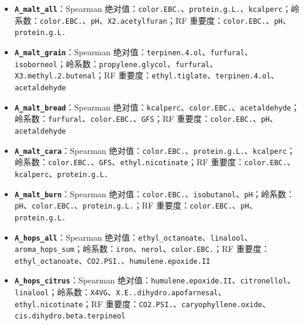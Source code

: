 \documentclass[
  11pt,
]{ctexart}
\providecommand{\tightlist}{%
  \setlength{\itemsep}{0pt}\setlength{\parskip}{0pt}}
\begin{document}
\begin{itemize}
\tightlist
\item
  \textbf{\texttt{A\_malt\_all}}：Spearman
  绝对值：\texttt{color.EBC.}、\texttt{protein.g.L.}、\texttt{kcalperc}；岭系数：\texttt{color.EBC.}、\texttt{pH}、\texttt{X2.\allowbreak{}acetylfuran}；RF
  重要度：\texttt{color.EBC.}、\texttt{pH}、\texttt{protein.g.L.}
\item
  \textbf{\texttt{A\_\allowbreak{}malt\_\allowbreak{}grain}}：Spearman
  绝对值：\texttt{terpinen.4.ol}、\texttt{furfural}、\texttt{isoborneol}；岭系数：\texttt{propylene.\allowbreak{}glycol}、\texttt{furfural}、\texttt{X3.\allowbreak{}methyl.\allowbreak{}2.\allowbreak{}butenal}；RF
  重要度：\texttt{ethyl.tiglate}、\texttt{terpinen.4.ol}、\texttt{acetaldehyde}
\item
  \textbf{\texttt{A\_\allowbreak{}malt\_\allowbreak{}bread}}：Spearman
  绝对值：\texttt{kcalperc}、\texttt{color.EBC.}、\texttt{acetaldehyde}；岭系数：\texttt{furfural}、\texttt{color.EBC.}、\texttt{GFS}；RF
  重要度：\texttt{color.EBC.}、\texttt{pH}、\texttt{acetaldehyde}
\item
  \textbf{\texttt{A\_malt\_cara}}：Spearman
  绝对值：\texttt{color.EBC.}、\texttt{protein.g.L.}、\texttt{kcalperc}；岭系数：\texttt{color.EBC.}、\texttt{GFS}、\texttt{ethyl.\allowbreak{}nicotinate}；RF
  重要度：\texttt{color.EBC.}、\texttt{kcalperc}、\texttt{protein.g.L.}
\item
  \textbf{\texttt{A\_malt\_burn}}：Spearman
  绝对值：\texttt{color.EBC.}、\texttt{isobutanol}、\texttt{pH}；岭系数：\texttt{pH}、\texttt{color.EBC.}、\texttt{protein.g.L.}；RF
  重要度：\texttt{color.EBC.}、\texttt{pH}、\texttt{protein.g.L.}
\item
  \textbf{\texttt{A\_hops\_all}}：Spearman
  绝对值：\texttt{ethyl\_\allowbreak{}octanoate}、\texttt{linalool}、\texttt{aroma\_\allowbreak{}hops\_\allowbreak{}sum}；岭系数：\texttt{iron}、\texttt{nerol}、\texttt{color.EBC.}；RF
  重要度：\texttt{ethyl\_\allowbreak{}octanoate}、\texttt{CO2.PSI.}、\texttt{humulene.\allowbreak{}epoxide.\allowbreak{}II}
\item
  \textbf{\texttt{A\_\allowbreak{}hops\_\allowbreak{}citrus}}：Spearman
  绝对值：\texttt{humulene.\allowbreak{}epoxide.\allowbreak{}II}、\texttt{citronellol}、\texttt{linalool}；岭系数：\texttt{X4VG}、\texttt{X.\allowbreak{}E.\allowbreak{}.\allowbreak{}dihydro.\allowbreak{}apofarnesal}、\texttt{ethyl.\allowbreak{}nicotinate}；RF
  重要度：\texttt{CO2.PSI.}、\texttt{caryophyllene.\allowbreak{}oxide}、\texttt{cis.\allowbreak{}dihydro.\allowbreak{}beta.\allowbreak{}terpineol}

\end{itemize}
\end{document}

